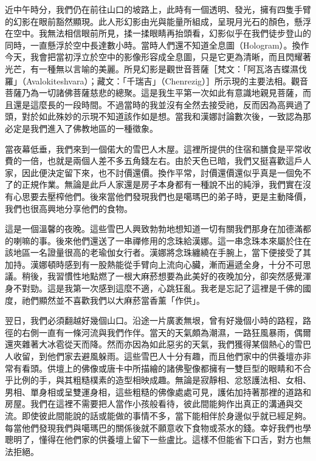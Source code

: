近中午時分，我們仍在前往山口的坡路上，此時有一個透明、發光，擁有四隻手臂的幻影在眼前豁然顯現。此人形幻影由光與能量所組成，呈現月光石的顏色，懸浮在空中。我無法相信眼前所見，揉一揉眼睛再抬頭看，幻影似乎在我們徒步登山的同時，一直懸浮於空中長達數小時。當時人們還不知道全息圖（Hologram）。換作今天，我會把當初浮立於空中的影像形容成全息圖，只是它更為清晰，而且閃耀著光芒，有一種無以言喻的美麗。所見幻影是觀世音菩薩［梵文：「阿瓦洛吉蝶濕伐羅」（Avalokiteshvara）；藏文：「千瑞吉」（Chenrezig）］所示現的主要法相。觀音菩薩乃為一切諸佛菩薩慈悲的總聚。這是我生平第一次如此有意識地親見菩薩，而且還是這麼長的一段時間。不過當時的我並沒有全然去接受祂，反而因為高興過了頭，對於如此殊妙的示現不知道該作如是想。當我和漢娜討論數次後，一致認為那必定是我們進入了佛教地區的一種徵象。

當夜幕低垂，我們來到一個偌大的雪巴人木屋。這裡所提供的住宿和膳食是平常收費的一倍，也就是兩個人差不多五角錢左右。由於天色已暗，我們又挺喜歡這戶人家，因此便決定留下來，也不討價還價。換作平常，討價還價還似乎真是一個免不了的正規作業。無論是此戶人家還是房子本身都有一種說不出的純淨，我們實在沒有心思要去壓榨他們。後來當他們發現我們也是噶瑪巴的弟子時，更是主動降價，我們也很高興地分享他們的食物。

這是一個溫馨的夜晚。這些雪巴人興致勃勃地想知道一切有關我們那身在加德滿都的喇嘛的事。後來他們還送了一串禪修用的念珠給漢娜。這一串念珠本來屬於住在該地區一名證量很高的老瑜伽女行者。漢娜將念珠纏繞在手腕上，當下便接受了其加持。漢娜頓時感到有一股熱能從手臂向上流向心臟，漸而遍遞全身，十分不可思議。稍後，我習慣性地點燃了一根大麻菸想要為此美好的夜晚加分，卻突然感覺渾身不對勁。這是我第一次感到這麼不適，心跳狂亂。我老是忘記了這裡是千佛的國度，祂們顯然並不喜歡我們以大麻菸當香薰「作供」。


翌日，我們必須翻越好幾個山口。沿途一片廣袤無垠，曾有好幾個小時的路程，路徑的右側一直有一條河流與我們作伴。當天的天氣頗為潮濕，一路狂風暴雨，偶爾還夾雜著大冰雹從天而降。然而亦因為如此惡劣的天氣，我們獲得某個熱心的雪巴人收留，到他們家去避風躲雨。這些雪巴人十分有趣，而且他們家中的供養壇亦非常有看頭。供壇上的佛像或唐卡中所描繪的諸佛聖像都擁有一雙巨型的眼睛和不合乎比例的手，與其粗糙樸素的造型相映成趣。無論是寂靜相、忿怒護法相、女相、男相、單身相或呈雙運身相，這些粗糙的佛像處處可見，護佑加持著那裡的道路和房屋。我們在這裡不需要把人當作小孩般看待，彼此間能夠作出真正的溝通與交流。即使彼此間能說的話或能做的事情不多，當下能相伴於身邊似乎就已經足夠。每當他們發現我們與噶瑪巴的關係後就不願意收下食物或茶水的錢。幸好我們也學聰明了，懂得在他們家的供養壇上留下一些盧比。這樣不但能省下口舌，對方也無法拒絕。

